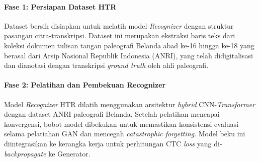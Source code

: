 \documentclass[12pt,a4paper]{article}
\begin{document}
\paragraph{Fase 1: Persiapan Dataset HTR}
Dataset bersih disiapkan untuk melatih model \textit{Recognizer} dengan struktur pasangan citra-transkripsi. Dataset ini merupakan ekstraksi baris teks dari koleksi dokumen tulisan tangan paleografi Belanda abad ke-16 hingga ke-18 yang berasal dari Arsip Nasional Republik Indonesia (ANRI), yang telah didigitalisasi dan dianotasi dengan transkripsi \textit{ground truth} oleh ahli paleografi.

\paragraph{Fase 2: Pelatihan dan Pembekuan Recognizer}
Model \textit{Recognizer} HTR dilatih menggunakan arsitektur \textit{hybrid} CNN-\textit{Transformer} dengan dataset ANRI paleografi Belanda. Setelah pelatihan mencapai konvergensi, bobot model dibekukan untuk memastikan konsistensi evaluasi selama pelatiahan GAN dan mencegah \textit{catastrophic forgetting}. Model beku ini diintegrasikan ke kerangka kerja untuk perhitungan CTC \textit{loss} yang di-\textit{backpropagate} ke Generator.
\end{document}
